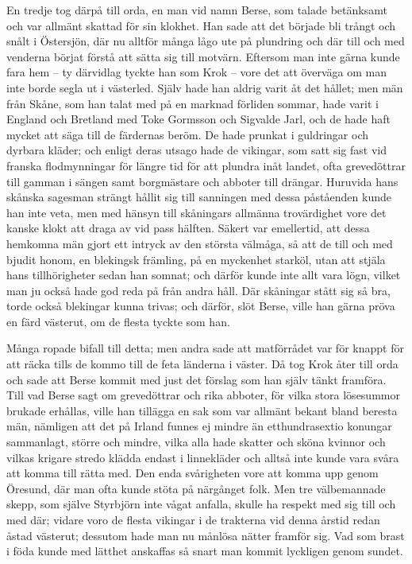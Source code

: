 \initial En tredje tog därpå till orda, en man vid namn Berse, som talade betänksamt och var allmänt skattad för sin klokhet. Han sade att det började bli trångt och snålt i Östersjön, där nu alltför många lågo ute på plundring och där till och med venderna börjat förstå att sätta sig till motvärn. Eftersom man inte gärna kunde fara hem – ty därvidlag tyckte han som Krok – vore det att överväga om man inte borde segla ut i västerled. Själv hade han aldrig varit åt det hållet; men män från Skåne, som han talat med på en marknad förliden sommar, hade varit i England och Bretland med Toke Gormsson och Sigvalde Jarl, och de hade haft mycket att säga till de färdernas beröm. De hade prunkat i guldringar och dyrbara kläder; och enligt deras utsago hade de vikingar, som satt sig fast vid franska flodmynningar för längre tid för att plundra inåt landet, ofta grevedöttrar till gamman i sängen samt borgmästare och abboter till drängar. Huruvida hans skånska sagesman strängt hållit sig till sanningen med dessa påståenden kunde han inte veta, men med hänsyn till skåningars allmänna trovärdighet vore det kanske klokt att draga av vid pass hälften. Säkert var emellertid, att dessa hemkomna män gjort ett intryck av den största välmåga, så att de till och med bjudit honom, en blekingsk främling, på en myckenhet starköl, utan att stjäla hans tillhörigheter sedan han somnat; och därför kunde inte allt vara lögn, vilket man ju också hade god reda på från andra håll. Där skåningar stått sig så bra, torde också blekingar kunna trivas; och därför, slöt Berse, ville han gärna pröva en färd västerut, om de flesta tyckte som han.

\initial Många ropade bifall till detta; men andra sade att matförrådet var för knappt för att räcka tills de kommo till de feta länderna i väster.
Då tog Krok åter till orda och sade att Berse kommit med just det förslag som han själv tänkt framföra. Till vad Berse sagt om grevedöttrar och rika abboter, för vilka stora lösesummor brukade erhållas, ville han tillägga en sak som var allmänt bekant bland beresta män, nämligen att det på Irland funnes ej mindre än etthundrasextio konungar sammanlagt, större och mindre, vilka alla hade skatter och sköna kvinnor och vilkas krigare stredo klädda endast i linnekläder och alltså inte kunde vara svåra att komma till rätta med. Den enda svårigheten vore att komma upp genom Öresund, där man ofta kunde stöta på närgånget folk. Men tre välbemannade skepp, som själve Styrbjörn inte vågat anfalla, skulle ha respekt med sig till och med där; vidare voro de flesta vikingar i de trakterna vid denna årstid redan åstad västerut; dessutom hade man nu månlösa nätter framför sig. Vad som brast i föda kunde med lätthet anskaffas så snart man kommit lyckligen genom sundet.

